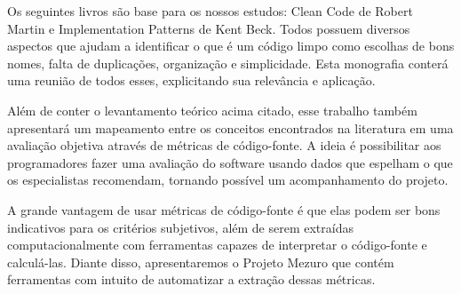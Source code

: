 \documentclass[11pt,a4paper]{book}
\begin{document}
Os seguintes livros são base para os nossos estudos: Clean Code de Robert Martin e Implementation Patterns de Kent Beck. Todos possuem diversos aspectos que ajudam a identificar o que é um código limpo como escolhas de bons nomes, falta de duplicações, organização e simplicidade. Esta monografia conterá uma reunião de todos esses, explicitando sua relevância e aplicação.
%

Além de conter o levantamento teórico acima citado, esse trabalho também apresentará um mapeamento entre os conceitos encontrados na literatura em uma avaliação objetiva através de métricas de código-fonte. A ideia é possibilitar aos programadores fazer uma avaliação do software usando dados que espelham o que os especialistas recomendam, tornando possível um acompanhamento do projeto.
%

A grande vantagem de usar métricas de código-fonte é que elas podem ser bons indicativos para os critérios subjetivos, além de serem extraídas computacionalmente com ferramentas capazes de interpretar o código-fonte e calculá-las. Diante disso, apresentaremos o Projeto Mezuro que contém ferramentas com intuito de automatizar a extração dessas métricas.


\mainmatter

\fancyhead[RE,LO]{\thesection}

\singlespacing              %




\backmatter \singlespacing
 
\end{document}
